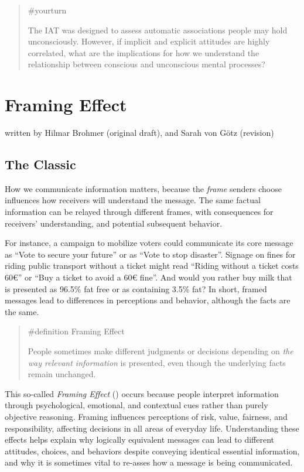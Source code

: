 \documentclass[
  letterpaper,
]{book}
\begin{document}
\begin{quote}
{\#yourturn}

The IAT was designed to assess automatic associations people may hold
unconsciously. However, if implicit and explicit attitudes are highly
correlated, what are the implications for how we understand the
relationship between conscious and unconscious mental processes?
\end{quote}


\chapter{\texorpdfstring{{Framing
Effect}}{Framing Effect}}\label{framing-effect}

{written by Hilmar Brohmer (original draft), and Sarah von Götz
(revision)}

\section{The Classic}\label{the-classic-3}

How we communicate information matters, because the \emph{frame} senders
choose influences how receivers will understand the message. The same
factual information can be relayed through different frames, with
consequences for receivers' understanding, and potential subsequent
behavior.

For instance, a campaign to mobilize voters could communicate its core
message as ``Vote to secure your future'' or as ``Vote to stop
disaster''. Signage on fines for riding public transport without a
ticket might read ``Riding without a ticket costs 60€'' or ``Buy a
ticket to avoid a 60€ fine''. And would you rather buy milk that is
presented as 96.5\% fat free or as containing 3.5\% fat? In short,
framed messages lead to differences in perceptions and behavior,
although the facts are the same.

\begin{quote}
\label{def-framingeffect}{\#definition} Framing Effect

People sometimes make different judgments or decisions depending on
\emph{the way relevant information} is presented, even though the
underlying facts remain unchanged.
\end{quote}

This so-called \emph{Framing Effect}
() occurs because
people interpret information through psychological, emotional, and
contextual cues rather than purely objective reasoning. Framing
influences perceptions of risk, value, fairness, and responsibility,
affecting decisions in all areas of everyday life. Understanding these
effects helps explain why logically equivalent messages can lead to
different attitudes, choices, and behaviors despite conveying identical
essential information, and why it is sometimes vital to re-asses how a
message is being communicated.
\end{document}
